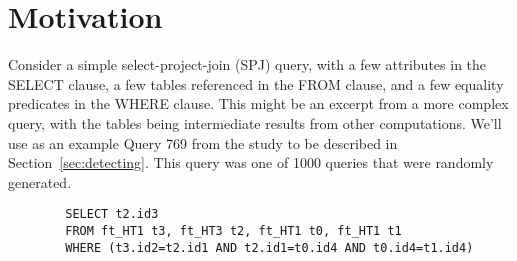\section{Motivation}
Consider a simple select-project-join (SPJ) query, with a few attributes in
the SELECT clause, a few tables referenced in the FROM clause,
and a few equality predicates in the WHERE clause. This might be an
excerpt from a more complex query, with the tables being intermediate
results from other computations. We'll use as an example Query 769 from the
study to be described in Section~\ref{sec:detecting}. This query was one of 1000
queries that were randomly generated.

\vspace*{-2ex}
{\small\begin{verbatim}
        SELECT t2.id3 
        FROM ft_HT1 t3, ft_HT3 t2, ft_HT1 t0, ft_HT1 t1 
        WHERE (t3.id2=t2.id1 AND t2.id1=t0.id4 AND t0.id4=t1.id4)
\end{verbatim}
}

